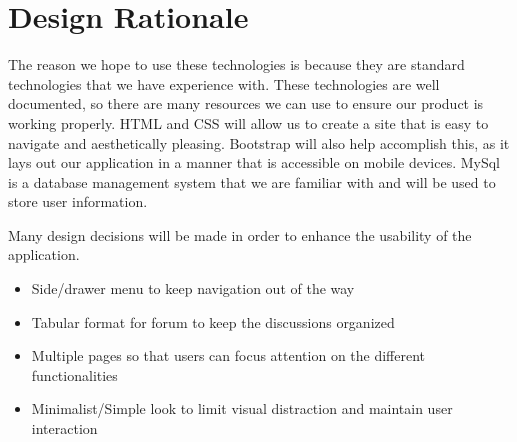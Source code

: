 \chapter{Design Rationale}
The reason we hope to use these technologies is because they are standard technologies that we have experience with. These technologies are well documented, so there are many resources we can use to ensure our product is working properly. HTML and CSS will allow us to create a site that is easy to navigate and aesthetically pleasing. Bootstrap will also help accomplish this, as it  lays out our application in a manner that is accessible on mobile devices. MySql is a database management system that we are familiar with and will be used to store user information.

Many design decisions will be made in order to enhance the usability of the application.
\begin{itemize}
	\item Side/drawer menu to keep navigation out of the way
	\item Tabular format for forum to keep the discussions organized
	\item Multiple pages so that users can focus attention on the different functionalities
	\item Minimalist/Simple look to limit visual distraction and maintain user interaction
\end{itemize}